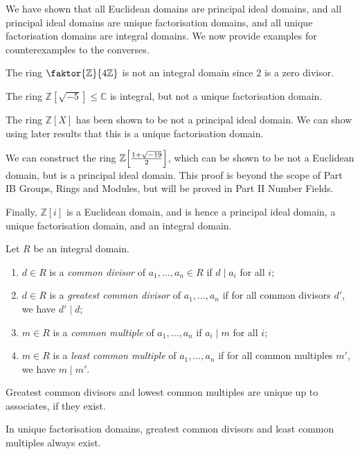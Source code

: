 \begin{example}
	We have shown that all Euclidean domains are principal ideal domains, and all principal ideal domains are unique factorisation domains, and all unique factorisation domains are integral domains.
	We now provide examples for counterexamples to the converses.

	The ring \( \faktor{\mathbb Z}{4\mathbb Z} \) is not an integral domain since \( 2 \) is a zero divisor.

	The ring \( \mathbb Z[\sqrt{-5}] \leq \mathbb C \) is integral, but not a unique factorisation domain.

	The ring \( \mathbb Z[X] \) has been shown to be not a principal ideal domain.
	We can show using later results that this is a unique factorisation domain.

	We can construct the ring \( \mathbb Z\qty[\frac{1+\sqrt{-19}}{2}] \), which can be shown to be not a Euclidean domain, but is a principal ideal domain.
	This proof is beyond the scope of Part IB Groups, Rings and Modules, but will be proved in Part II Number Fields.

	Finally, \( \mathbb Z[i] \) is a Euclidean domain, and is hence a principal ideal domain, a unique factorisation domain, and an integral domain.
\end{example}
\begin{definition}
	Let \( R \) be an integral domain.
	\begin{enumerate}
		\item \( d \in R \) is a \textit{common divisor} of \( a_1, \dots, a_n \in R \) if \( d \mid a_i \) for all \( i \);
		\item \( d \in R \) is a \textit{greatest common divisor} of \( a_1, \dots, a_n \) if for all common divisors \( d' \), we have \( d' \mid d \);
		\item \( m \in R \) is a \textit{common multiple} of \( a_1, \dots, a_n \) if \( a_i \mid m \) for all \( i \);
		\item \( m \in R \) is a \textit{least common multiple} of \( a_1, \dots, a_n \) if for all common multiples \( m' \), we have \( m \mid m' \).
	\end{enumerate}
\end{definition}
\begin{remark}
	Greatest common divisors and lowest common multiples are unique up to associates, if they exist.
\end{remark}
\begin{proposition}
	In unique factorisation domains, greatest common divisors and least common multiples always exist.
\end{proposition}
